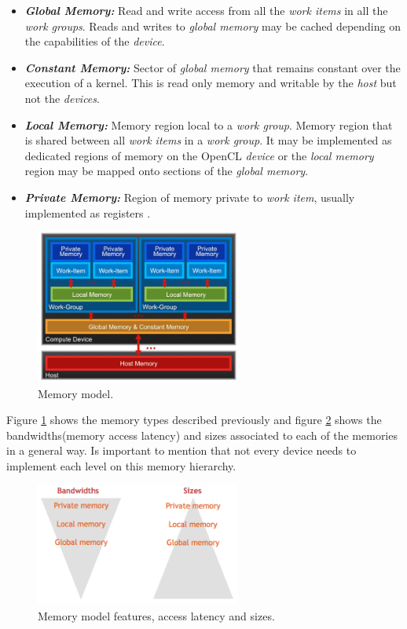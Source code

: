 \begin{itemize}
    \item\textbf{\textit{Global Memory:}} Read and write access from all the \emph{work items} in all the \emph{work groups}. Reads
        and writes to \emph{global memory} may be cached depending on the capabilities of the \emph{device}\cite{opencl12}.

    \item\textbf{\textit{Constant Memory:}} Sector of \emph{global memory} that remains constant over the execution of a kernel.
        This is read only memory and writable by the \emph{host} but not the \emph{devices}\cite{wikipedia_opencl,opencl12}.

    \item\textbf{\textit{Local Memory:}} Memory region local to a \emph{work group}. Memory region that is shared between all
        \emph{work items} in a \emph{work group}. It may be implemented as dedicated regions of memory on the OpenCL \emph{device}
        or the \emph{local memory} region may be mapped onto sections of the \emph{global memory}\cite{opencl12}.

    \item\textbf{\textit{Private Memory:}} Region of memory private to \emph{work item}, usually implemented as registers
        \cite{wikipedia_opencl,opencl12}.
\end{itemize}

\begin{figure}[!h]
    \centering
    \includegraphics[width=0.6\textwidth]{figures/memories1.png}
    \caption{Memory model\cite{hands_on_opencl}.}
    \label{MemoryModel}
\end{figure}

\par{Figure \ref{MemoryModel} shows the memory types described previously and figure \ref{MemoryModelFeatures} shows the 
    bandwidths(memory access latency) and sizes associated to each of the memories in a general way. Is important to mention that
    not every device needs to implement each level on this memory hierarchy\cite{wikipedia_opencl}.}

\begin{figure}[!h]
    \centering
    \includegraphics[width=0.6\textwidth]{figures/memories.png}
    \caption{Memory model features, access latency and sizes\cite{hands_on_opencl}.}
    \label{MemoryModelFeatures}
\end{figure}


